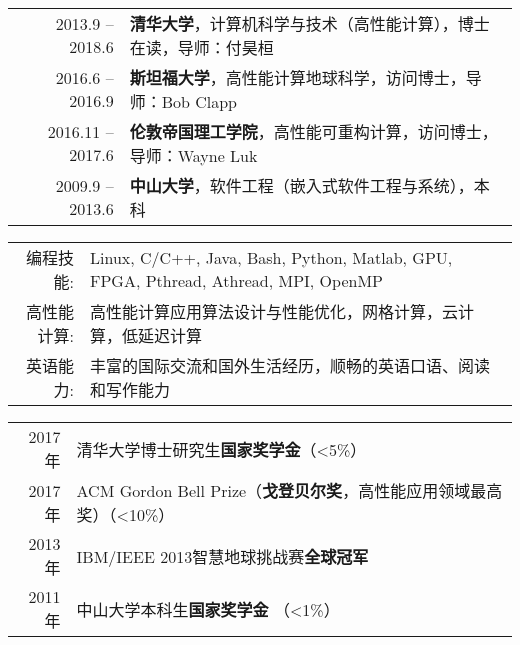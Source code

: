 \documentclass[localFont]{awesome-source-cv} %
\begin{document}
\makecvheader

%
	\vspace{-18mm}
\begin{tabular}{rl}
	\textsc{2013.9 -- 2018.6}		&	\textbf{清华大学}，计算机科学与技术（高性能计算），博士在读，导师：付昊桓  \\
	\textsc{2016.6 -- 2016.9}		&	\textbf{斯坦福大学}，高性能计算地球科学，访问博士，导师：Bob Clapp \\
	\textsc{2016.11 -- 2017.6}		&	\textbf{伦敦帝国理工学院}，高性能可重构计算，访问博士，导师：Wayne Luk \\
	\textsc{2009.9 -- 2013.6}		&	\textbf{中山大学}，软件工程（嵌入式软件工程与系统），本科 \\
\end{tabular}

\begin{tabular}{>{}r>{}p{14cm}}
	\textsc{编程技能:}		&  Linux, C/C++, Java, Bash, Python, Matlab, GPU, FPGA, Pthread, Athread, MPI, OpenMP \\
	\textsc{高性能计算:} 		&  高性能计算应用算法设计与性能优化，网格计算，云计算，低延迟计算 \\
	\textsc{英语能力:}	    &  丰富的国际交流和国外生活经历，顺畅的英语口语、阅读和写作能力 \\
\end{tabular}

\begin{tabular}{rl}
	2017年 & 清华大学博士研究生\textbf{国家奖学金}（<5\%） \\
	2017年 & ACM Gordon Bell Prize（\textbf{戈登贝尔奖}，高性能应用领域最高奖）（<10\%）\\
	2013年 & IBM/IEEE 2013智慧地球挑战赛\textbf{全球冠军} \\
	2011年 & 中山大学本科生\textbf{国家奖学金} （<1\%）
\end{tabular}
\end{document}
